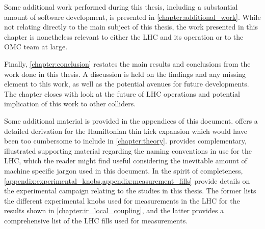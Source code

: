 Some additional work performed during this thesis, including a substantial amount of software development, is presented in \cref{chapter:additional_work}.
While not relating directly to the main subject of this thesis, the work presented in this chapter is nonetheless relevant to either the \acrshort{LHC} and its operation or to the \acrshort{OMC} team at large.

Finally, \cref{chapter:conclusion} restates the main results and conclusions from the work done in this thesis.
A discussion is held on the findings and any missing element to this work, as well as the potential avenues for future developments.
The chapter closes with look at the future of LHC operations and potential implication of this work to other colliders.

Some additional material is provided in the appendices of this document.
 offers a detailed derivation for the Hamiltonian thin kick expansion which would have been too cumbersome to include in \cref{chapter:theory}.
 provides complementary, illustrated supporting material regarding the naming conventions in use for the \acrshort{LHC}, which the reader might find useful considering the inevitable amount of machine specific jargon used in this document.
In the spirit of completeness, \cref{appendix:experimental_knobs,appendix:measurement_fills} provide details on the experimental campaign relating to the studies in this thesis.
The former lists the different experimental knobs used for measurements in the LHC for the results shown in \cref{chapter:ir_local_coupling}, and the latter provides a comprehensive list of the LHC fills used for measurements.


